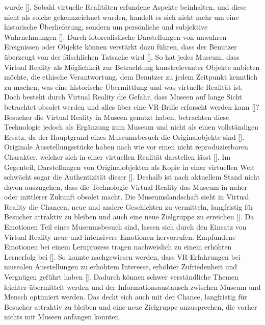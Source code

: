 \documentclass[a4paper,12pt,oneside]{article}
\begin{document}
        wurde [\cite[38]{Heidsiek2019}]. Sobald virtuelle Realitäten erfundene Aspekte 
        beinhalten, und diese nicht als solche gekennzeichnet wurden, handelt es sich nicht
        mehr um eine historische Überlieferung, sondern um persönliche und subjektive 
        Wahrnehmungen [\cite[38]{Heidsiek2019}]. Durch fotorealistische Darstellungen
        von unwahren Ereignissen oder Objekte können verstärkt dazu führen, dass der
        Benutzer überzeugt von der fälschlichen Tatsache wird [\cite[39]{Heidsiek2019}].
        So hat jedes Museum, dass Virtual Reality als Möglichkeit zur Betrachtung 
        kunstrelevanter Objekte anbieten möchte, die ethische Verantwortung, 
        dem Benutzer zu jedem Zeitpunkt kenntlich zu machen,
        was eine historische Übermittlung und was virtuelle Realität ist.
        Doch besteht durch Virtual Reality die Gefahr, dass Museen auf lange Sicht 
        betrachtet obsolet werden und alles über eine VR-Brille erforscht werden kann
        [\cite[142-143]{Huennekens2002}]? Besucher die Virtual Reality in Museen genutzt
        haben, betrachten diese Technologie jedoch als Ergänzung zum Museum und nicht als
        einen vollständigen Ersatz, da der Hauptgrund eines Museumsbesuch die 
        Originalobjekte sind [\cite[79]{Heidsiek2019}]. Originale Ausstellungsstücke
        haben nach wie vor einen nicht reproduzierbaren Charakter, welcher sich in einer
        virtuellen Realität darstellen lässt [\cite[93]{Heidsiek2019}]. Im Gegenteil,
        Darstellungen von Originalobjekten als Kopie in einer virtuellen Welt schwächt
        sogar die Authentizität dieser [\cite[93]{Heidsiek2019}]. Deshalb ist nach aktuellem
        Stand nicht davon auszugehen, dass die Technologie Virtual Reality das Museum in
        naher oder mittlerer Zukunft obsolet macht.
        Die Museumslandschaft sieht in Virtual Reality die Chancen, neue und andere
        Geschichten zu vermitteln, langfristig für Besucher attraktiv zu bleiben und
        auch eine neue Zielgruppe zu erreichen [\cite[34-35]{Heidsiek2019}].
        Da Emotionen Teil eines Museumsbesuch sind, lassen sich durch den Einsatz
        von Virtual Reality neue und intensivere Emotionen hervorrufen. Empfundene 
        Emotionen bei einem Lernprozess tragen nachweislich zu einem erhöhten Lernerfolg
        bei [\cite[29]{Heidsiek2019}]. So konnte nachgewiesen werden, dass VR-Erfahrungen
        bei musealen Ausstellungen zu erhöhtem Interesse, erhöhter Zufriedenheit und 
        Vergnügen geführt haben [\cite[69-72]{Heidsiek2019}]. Dadurch können schwer
        verständliche Themen leichter übermittelt werden und der Informationsaustausch
        zwischen Museum und Mensch optimiert werden. Das deckt sich auch mit der Chance,
        langfristig für Besucher attraktiv zu bleiben und eine neue Zielgruppe anzusprechen,
        die vorher nichts mit Museen anfangen konnten.
\end{document}

